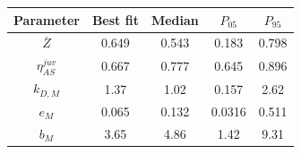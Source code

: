 \begin{tabular}{ccccc}
\toprule
Parameter & Best fit & Median & $P_{05}$ & $P_{95}$\\
\midrule
$\overline{Z}$ & 0.649 & 0.543 & 0.183 & 0.798\\
$\eta_{AS}^{juv}$ & 0.667 & 0.777 & 0.645 & 0.896\\
$k_{D,M}$ & 1.37 & 1.02 & 0.157 & 2.62\\
$e_M$ & 0.065 & 0.132 & 0.0316 & 0.511\\
$b_M$ & 3.65 & 4.86 & 1.42 & 9.31\\
\bottomrule
\end{tabular}
